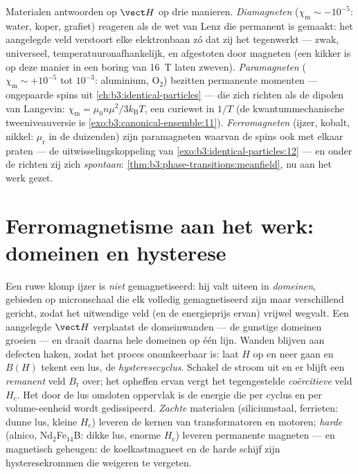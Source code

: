 \begin{remark}\label{rem:b3:electromagnetism-in-matter:zoo}
Materialen antwoorden op $\vect H$ op drie manieren.
\emph{Diamagneten} ($\chi_{\text{m}} \sim -10^{-5}$: water, koper,
grafiet) reageren als de wet van Lenz die permanent is gemaakt: het aangelegde veld
verstoort elke elektronbaan zó dat zij het tegenwerkt --- zwak, universeel,
temperatuuronafhankelijk, en afgestoten door magneten (een kikker is
op deze manier in een boring van \qty{16}{T} laten zweven).
\emph{Paramagneten} ($\chi_{\text{m}} \sim +10^{-5}$ tot $10^{-3}$:
aluminium, O$_2$) bezitten permanente momenten --- ongepaarde spins uit
\cref{ch:b3:identical-particles} --- die zich richten als de dipolen van
Langevin: $\chi_{\text{m}} = \mu_0 n\mu^2/3k_{\text{B}}T$, een curiewet
in $1/T$ (de kwantummechanische tweeniveauversie is
\cref{exo:b3:canonical-ensemble:11}).
\emph{Ferromagneten} (ijzer, kobalt, nikkel: $\mu_{\text{r}}$ in de
duizenden) zijn paramagneten waarvan de spins ook met elkaar praten ---
de uitwisselingskoppeling van \cref{exo:b3:identical-particles:12} ---
en onder de  richten zij zich \emph{spontaan}:
\cref{thm:b3:phase-transitions:meanfield}, nu aan het werk gezet.
\end{remark}

\section{Ferromagnetisme aan het werk: domeinen en hysterese}

\begin{definition}\label{def:b3:electromagnetism-in-matter:hysteresis}
Een ruwe klomp ijzer is \emph{niet} gemagnetiseerd: hij valt uiteen in
\emph{domeinen}, gebieden op micronschaal die elk volledig gemagnetiseerd zijn maar
verschillend gericht, zodat het uitwendige veld (en de energieprijs ervan)
vrijwel wegvalt. Een aangelegde $\vect H$ verplaatst de domeinwanden ---
de gunstige domeinen groeien --- en draait daarna hele domeinen op één
lijn. Wanden blijven aan defecten haken, zodat het proces onomkeerbaar is: laat
$H$ op en neer gaan en $B(H)$ tekent een lus, de \emph{hysteresecyclus}.
Schakel de stroom uit en er blijft een \emph{remanent} veld
$B_{\text{r}}$ over; het opheffen ervan vergt het tegengestelde
\emph{coërcitieve} veld $H_{\text{c}}$. Het door de lus omsloten oppervlak is de
energie die per cyclus en per volume-eenheid wordt gedissipeerd. \emph{Zachte}
materialen (siliciumstaal, ferrieten: dunne lus, kleine
$H_{\text{c}}$) leveren de kernen van transformatoren en motoren; \emph{harde}
(alnico, Nd$_2$Fe$_{14}$B: dikke lus, enorme $H_{\text{c}}$) leveren
permanente magneten --- en magnetisch geheugen: de koelkastmagneet
en de harde schijf zijn hysteresekrommen die weigeren te vergeten.
\end{definition}

